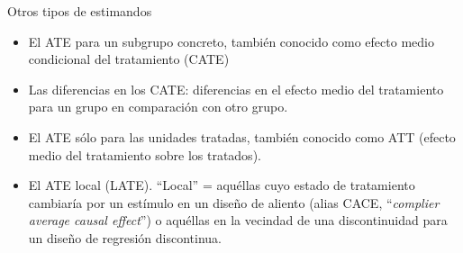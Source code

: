 \documentclass[
  ignorenonframetext,
]{beamer}
\begin{document}
\begin{frame}{Otros tipos de estimandos}
\protect\hypertarget{otros-tipos-de-estimandos}{}
\begin{itemize}
\item
  El ATE para un subgrupo concreto, también conocido como efecto medio
  condicional del tratamiento (CATE)
\item
  Las diferencias en los CATE: diferencias en el efecto medio del
  tratamiento para un grupo en comparación con otro grupo.
\item
  El ATE sólo para las unidades tratadas, también conocido como ATT
  (efecto medio del tratamiento sobre los tratados).
\item
  El ATE local (LATE). ``Local'' = aquéllas cuyo estado de tratamiento
  cambiaría por un estímulo en un diseño de aliento (alias CACE,
  ``\emph{complier average causal effect}'') o aquéllas en la vecindad
  de una discontinuidad para un diseño de regresión discontinua.
\end{itemize}
\end{frame}
\end{document}
